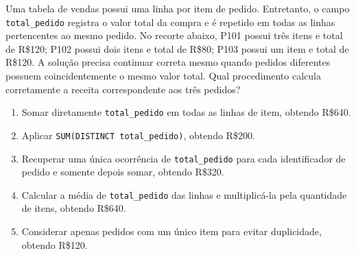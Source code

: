 \documentclass[12pt,a4paper]{article}
\begin{document}
\TextoBase
Uma tabela de vendas possui uma linha por item de pedido. Entretanto, o campo \texttt{total\_pedido} registra o valor total da compra e é repetido em todas as linhas pertencentes ao mesmo pedido. No recorte abaixo, P101 possui três itens e total de R\$120; P102 possui dois itens e total de R\$80; P103 possui um item e total de R\$120. A solução precisa continuar correta mesmo quando pedidos diferentes possuem coincidentemente o mesmo valor total.
\FonteDidatica
\Comando Qual procedimento calcula corretamente a receita correspondente aos três pedidos?
\begin{enumerate}[label=\Alph*)]
\item Somar diretamente \texttt{total\_pedido} em todas as linhas de item, obtendo R\$640.
\item Aplicar \texttt{SUM(DISTINCT total\_pedido)}, obtendo R\$200.
\item Recuperar uma única ocorrência de \texttt{total\_pedido} para cada identificador de pedido e somente depois somar, obtendo R\$320.
\item Calcular a média de \texttt{total\_pedido} das linhas e multiplicá-la pela quantidade de itens, obtendo R\$640.
\item Considerar apenas pedidos com um único item para evitar duplicidade, obtendo R\$120.
\end{enumerate}
\end{document}
